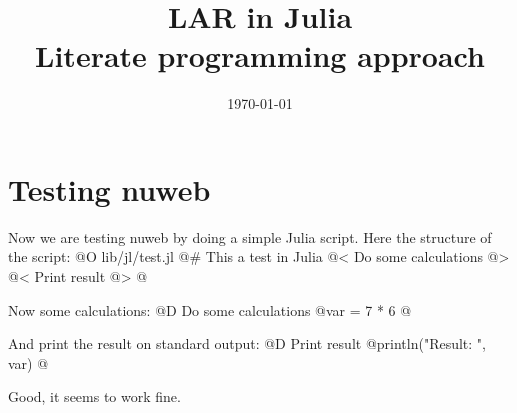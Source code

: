 \documentclass[11pt]{book}
\title{LAR in Julia \\ \small Literate programming approach}
\date{\today}
\begin{document}
\maketitle
\newpage

\section{Testing nuweb}
Now we are testing nuweb by doing a simple Julia script. Here the structure of the script:
@O lib/jl/test.jl
@{# This a test in Julia
@< Do some calculations @>
@< Print result @>
@}

Now some calculations:
@D Do some calculations
@{var = 7 * 6
@}

And print the result on standard output:
@D Print result
@{println("Result: ", var)
@}

Good, it seems to work fine.
\end{document}
